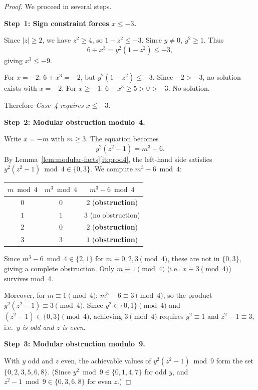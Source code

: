 \documentclass[12pt,a4paper]{article}
\theoremstyle{definition}
\begin{document}
\begin{proof}
We proceed in several steps.

\medskip
\noindent\textbf{Step~1: Sign constraint forces $x \leq -3$.}

Since $|z| \geq 2$, we have $z^2 \geq 4$, so $1 - z^2 \leq -3$.
Since $y \neq 0$, $y^2 \geq 1$.
Thus
\[
  6 + x^3 = y^2(1-z^2) \leq -3,
\]
giving $x^3 \leq -9$.

For $x = -2$: $6 + x^3 = -2$, but $y^2(1-z^2) \leq -3$.
Since $-2 > -3$, no solution exists with $x = -2$.
For $x \geq -1$: $6 + x^3 \geq 5 > 0 > -3$. No solution.

Therefore \emph{Case~4 requires $x \leq -3$}.

\medskip
\noindent\textbf{Step~2: Modular obstruction modulo~4.}

Write $x = -m$ with $m \geq 3$.  The equation becomes
\[
  y^2(z^2 - 1) = m^3 - 6. \tag{$\dagger$}
\]
By Lemma~\ref{lem:modular-facts}\ref{it:prod4}, the left-hand side satisfies
$y^2(z^2-1) \bmod 4 \in \{0, 3\}$.
We compute $m^3 - 6 \bmod 4$:

\begin{center}
\begin{tabular}{ccc}
\toprule
$m \bmod 4$ & $m^3 \bmod 4$ & $m^3 - 6 \bmod 4$ \\
\midrule
$0$         & $0$           & $2$ \quad (\textbf{obstruction}) \\
$1$         & $1$           & $3$ \quad (no obstruction) \\
$2$         & $0$           & $2$ \quad (\textbf{obstruction}) \\
$3$         & $3$           & $1$ \quad (\textbf{obstruction}) \\
\bottomrule
\end{tabular}
\end{center}

Since $m^3 - 6 \bmod 4 \in \{2, 1\}$ for $m \equiv 0, 2, 3 \pmod 4$, these
are not in $\{0, 3\}$, giving a complete obstruction.
Only $m \equiv 1 \pmod 4$ (i.e.\ $x \equiv 3 \pmod 4$) survives mod~4.

Moreover, for $m \equiv 1 \pmod 4$: $m^3 - 6 \equiv 3 \pmod 4$, so
the product $y^2(z^2-1) \equiv 3 \pmod 4$.
Since $y^2 \in \{0,1\} \pmod 4$ and $(z^2-1) \in \{0,3\} \pmod 4$,
achieving $3 \pmod 4$ requires $y^2 \equiv 1$ and $z^2-1 \equiv 3$,
i.e.\ \emph{$y$ is odd and $z$ is even}.

\medskip
\noindent\textbf{Step~3: Modular obstruction modulo~9.}

With $y$ odd and $z$ even, the achievable values of $y^2(z^2-1) \bmod 9$ form
the set $\{0, 2, 3, 5, 6, 8\}$.
(Since $y^2 \bmod 9 \in \{0,1,4,7\}$ for odd $y$,
and $z^2 - 1 \bmod 9 \in \{0, 3, 6, 8\}$ for even $z$.)


\end{proof}
\end{document}
